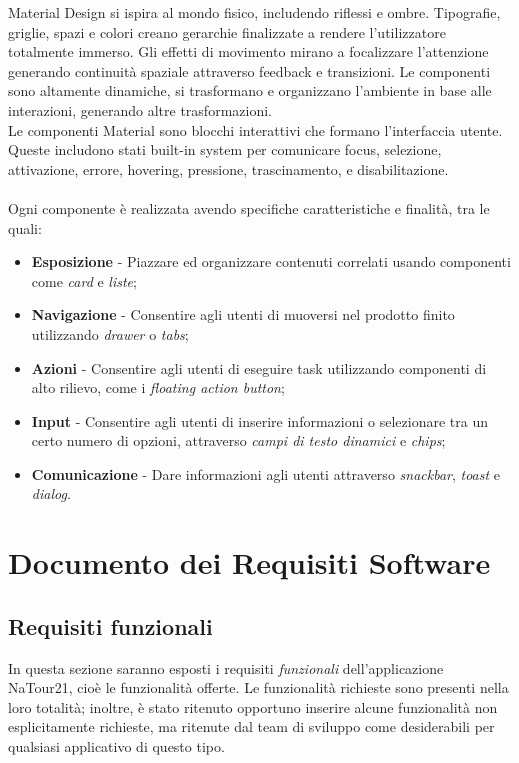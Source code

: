 \documentclass{natourDoc}
\begin{document}
Material Design si ispira al mondo fisico, includendo riflessi e ombre. Tipografie, griglie, spazi e colori creano gerarchie finalizzate a rendere l'utilizzatore totalmente immerso.
Gli effetti di movimento mirano a focalizzare l'attenzione generando continuità spaziale attraverso feedback e transizioni.
Le componenti sono altamente dinamiche, si trasformano e organizzano l'ambiente in base alle interazioni, generando altre trasformazioni.\\
Le componenti Material sono blocchi interattivi che formano l'interfaccia utente.
Queste includono stati built-in system per comunicare focus, selezione, attivazione, errore, hovering, pressione, trascinamento, e disabilitazione. \\\\
Ogni componente è realizzata avendo specifiche caratteristiche e finalità, tra le quali:
\begin{itemize}
	\item \textbf{Esposizione} - Piazzare ed organizzare contenuti correlati usando componenti come \textit{card} e \textit{liste};
	\item \textbf{Navigazione} - Consentire agli utenti di muoversi nel prodotto finito utilizzando \textit{drawer} o \textit{tabs};
	\item \textbf{Azioni} - Consentire agli utenti di eseguire task utilizzando componenti di alto rilievo, come i \textit{floating action button};
	\item \textbf{Input} - Consentire agli utenti di inserire informazioni o selezionare tra un certo numero di opzioni, attraverso \textit{campi di testo dinamici} e \textit{chips};
	\item \textbf{Comunicazione} - Dare informazioni agli utenti attraverso \textit{snackbar}, \textit{toast} e \textit{dialog}.
\end{itemize}


\newpage
\section{Documento dei Requisiti Software}
\subsection{Requisiti funzionali}
In questa sezione saranno esposti i requisiti \textit{funzionali} dell'applicazione NaTour21, cioè le funzionalità offerte.
Le funzionalità richieste sono presenti nella loro totalità; inoltre, è stato ritenuto opportuno inserire alcune funzionalità non 
esplicitamente richieste, ma ritenute dal team di sviluppo come desiderabili per qualsiasi applicativo di questo tipo.
\end{document}
